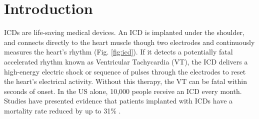 \section{Introduction}
\label{sec:intro}
\acp{ICD} are life-saving medical devices.
An \ac{ICD} is implanted under the shoulder, and connects directly to the heart muscle though two electrodes and continuously measures the heart's rhythm (Fig. \ref{fig:icd}).
If it detects a potentially fatal accelerated rhythm known as Ventricular Tachycardia (VT), the \ac{ICD} delivers a high-energy electric shock or sequence of pulses through the electrodes to reset the heart's electrical activity.
Without this therapy, the VT can be fatal within seconds of onset.
In the US alone, 10,000 people receive an \ac{ICD} every month.
Studies have presented evidence that patients implanted with \acp{ICD} have a mortality rate reduced by up to 31\% \cite{maditrit}.

